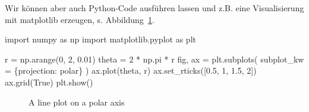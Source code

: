 \documentclass[
  letterpaper,
  DIV=11]{scrartcl}
\newenvironment{Shaded}{\begin{snugshade}}{\end{snugshade}}
\newcommand{\DecValTok}[1]{\textcolor[rgb]{0.68,0.00,0.00}{#1}}
\newcommand{\FloatTok}[1]{\textcolor[rgb]{0.68,0.00,0.00}{#1}}
\newcommand{\ImportTok}[1]{\textcolor[rgb]{0.00,0.46,0.62}{#1}}
\newcommand{\NormalTok}[1]{\textcolor[rgb]{0.00,0.23,0.31}{#1}}
\newcommand{\OperatorTok}[1]{\textcolor[rgb]{0.37,0.37,0.37}{#1}}
\newcommand{\StringTok}[1]{\textcolor[rgb]{0.13,0.47,0.30}{#1}}
\newcommand{\VariableTok}[1]{\textcolor[rgb]{0.07,0.07,0.07}{#1}}
\begin{document}
Wir können aber auch Python-Code ausführen lassen und z.B. eine
Visualisierung mit matplotlib erzeugen, s. Abbildung~\ref{fig-polar}.

\begin{Shaded}
\begin{Highlighting}[]
\ImportTok{import}\NormalTok{ numpy }\ImportTok{as}\NormalTok{ np}
\ImportTok{import}\NormalTok{ matplotlib.pyplot }\ImportTok{as}\NormalTok{ plt}

\NormalTok{r }\OperatorTok{=}\NormalTok{ np.arange(}\DecValTok{0}\NormalTok{, }\DecValTok{2}\NormalTok{, }\FloatTok{0.01}\NormalTok{)}
\NormalTok{theta }\OperatorTok{=} \DecValTok{2} \OperatorTok{*}\NormalTok{ np.pi }\OperatorTok{*}\NormalTok{ r}
\NormalTok{fig, ax }\OperatorTok{=}\NormalTok{ plt.subplots(}
\NormalTok{  subplot\_kw }\OperatorTok{=}\NormalTok{ \{}\StringTok{\textquotesingle{}projection\textquotesingle{}}\NormalTok{: }\StringTok{\textquotesingle{}polar\textquotesingle{}}\NormalTok{\} }
\NormalTok{)}
\NormalTok{ax.plot(theta, r)}
\NormalTok{ax.set\_rticks([}\FloatTok{0.5}\NormalTok{, }\DecValTok{1}\NormalTok{, }\FloatTok{1.5}\NormalTok{, }\DecValTok{2}\NormalTok{])}
\NormalTok{ax.grid(}\VariableTok{True}\NormalTok{)}
\NormalTok{plt.show()}
\end{Highlighting}
\end{Shaded}

\begin{figure}[H]


\caption{\label{fig-polar}A line plot on a polar axis}

\end{figure}%
\end{document}
